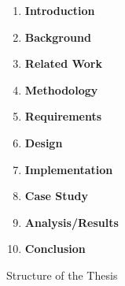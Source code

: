 \documentclass[runningheads,a4paper]{llncs}
\begin{document}
\begin{figure}[h!]
\begin{center}
\begin{minipage}[t]{0.5\textwidth}
\begin{enumerate}

\item
\textbf{Introduction}

\item
\textbf{Background}

\item
\textbf{Related Work}

\item
\textbf{Methodology}

\item
\textbf{Requirements}

\item
\textbf{Design}

\item
\textbf{Implementation}

\item
\textbf{Case Study}

\item
\textbf{Analysis/Results}

\item
\textbf{Conclusion}

\end{enumerate}
\end{minipage}
\end{center}
\caption{Structure of the Thesis}
\label{figure:StructureOfTheThesis}
\end{figure}





\cite{DBLP:conf/ecmdafa/LammelV14}
\cite{DBLP:conf/models/FavreLV12}
\cite{DBLP:journals/dke/Varzi96}
\cite{DBLP:journals/entcs/FavreN05}
\cite{Softlang:course/ptt15/technoloymodeling}
\cite{DBLP:conf/sle/Lammel16}


{}

\end{document}
